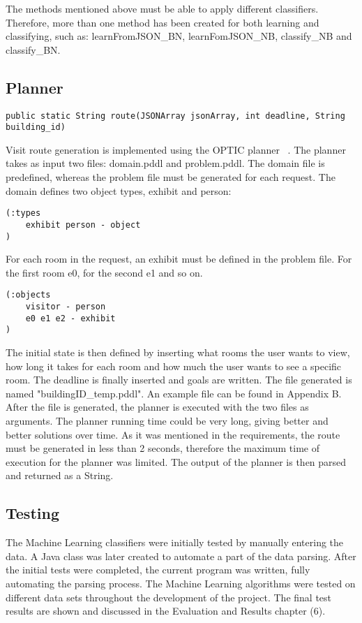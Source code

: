 The methods mentioned above must be able to apply different classifiers. Therefore, more than one method has been created for both learning and classifying, such as: learnFromJSON\_BN, learnFomJSON\_NB, classify\_NB and classify\_BN. 
\newpage

\subsection{Planner}
\begin{lstlisting}
public static String route(JSONArray jsonArray, int deadline, String building_id)
\end{lstlisting}
Visit route generation is implemented using the OPTIC planner ~\cite{OPTIC}. The planner takes as input two files: domain.pddl and problem.pddl. The domain file is predefined, whereas the problem file must be generated for each request. 
The domain defines two object types, exhibit and person: 
\begin{lstlisting}
(:types
    exhibit person - object
)
\end{lstlisting}
For each room in the request, an exhibit must be defined in the problem file. For the first room e0, for the second e1 and so on.
\begin{lstlisting}
(:objects
    visitor - person
    e0 e1 e2 - exhibit
)
\end{lstlisting}
The initial state is then defined by inserting what rooms the user wants to view, how long it takes for each room and how much the user wants to see a specific room. The deadline is finally inserted and goals are written. The file generated is named "buildingID\_temp.pddl". An example file can be found in Appendix B.
After the file is generated, the planner is executed with the two files as arguments. The planner running time could be very long, giving better and better solutions over time. As it was mentioned in the requirements, the route must be generated in less than 2 seconds, therefore the maximum time of execution for the planner was limited. The output of the planner is then parsed and returned as a String. 

\subsection{Testing}

The Machine Learning classifiers were initially tested by manually entering the data. A Java class was later created to automate a part of the data parsing. After the initial tests were completed, the current program was written, fully automating the parsing process. The Machine Learning algorithms were tested on different data sets throughout the development of the project. The final test results are shown and discussed in the Evaluation and Results chapter (6). 


